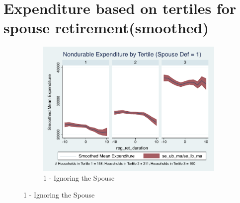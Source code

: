 \documentclass[11pt,onecolumn]{article}
\numberwithin{figure}{section}
\begin{document}
\section{Expenditure based on tertiles for spouse retirement(smoothed)} 
\begin{figure}
\begin{subfigure}{1.0\textwidth}
	\caption{1 - Ignoring the Spouse}
	\centering
	\includegraphics[width=0.8\linewidth]{../ConsumptionPostRetirement_by_SpouseDef/Smoothed/spouse_def_1.pdf}
	\end{subfigure}
	\vspace{1cm}


\end{figure}
\end{document}
